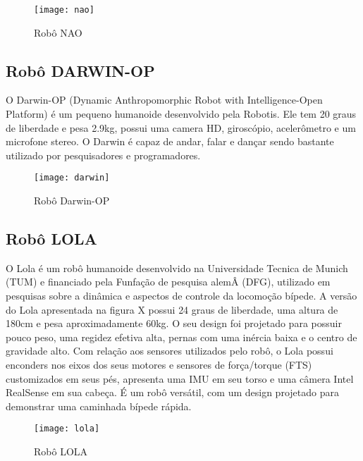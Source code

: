 \begin{figure} [H]	
    \centering
    \caption{Robô NAO}
    \texttt{[image: nao]}
    \label{fig:nao}
\end{figure}

\subsection{Robô DARWIN-OP}
\label{ssec:darwin}

O Darwin-OP (Dynamic Anthropomorphic Robot with Intelligence-Open Platform)  é um pequeno humanoide desenvolvido pela Robotis. Ele tem 20 graus de liberdade e pesa 2.9kg, possui uma camera HD, giroscópio, acelerômetro e um microfone stereo. O Darwin é capaz de andar, falar e dançar sendo bastante utilizado por pesquisadores e programadores.

\begin{figure} [H]
    \centering
    \caption{Robô Darwin-OP}
    \texttt{[image: darwin]}
    \label{fig:darwin}
\end{figure}

\subsection{Robô LOLA}
\label{ssec:lola}

O Lola é um robô humanoide desenvolvido na Universidade Tecnica de Munich (TUM) e financiado pela Funfação de pesquisa alemÂ (DFG), utilizado em pesquisas sobre a dinâmica e aspectos de controle da locomoção bípede. A versão do Lola apresentada na figura X possui 24 graus de liberdade, uma altura de 180cm e pesa aproximadamente 60kg. O seu design foi projetado para possuir pouco peso, uma regidez efetiva alta, pernas com uma inércia baixa e o centro de gravidade alto. Com relação aos sensores utilizados pelo robô, o Lola possui enconders nos eixos dos seus motores e sensores de força/torque (FTS) customizados em seus pés, apresenta uma IMU em seu torso e uma câmera Intel RealSense em sua cabeça. É um robô versátil, com um design projetado para demonstrar uma caminhada bípede rápida.

\begin{figure} [H]
    \centering
    \caption{Robô LOLA}
    \texttt{[image: lola]}
    \label{fig:lola}
\end{figure}

